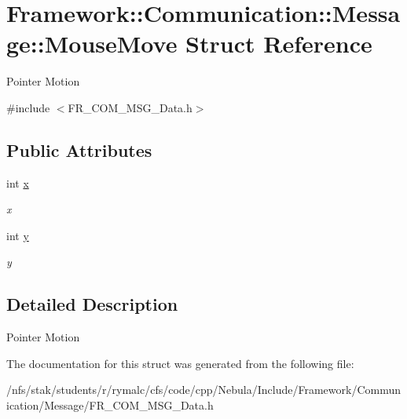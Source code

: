 \hypertarget{structFramework_1_1Communication_1_1Message_1_1MouseMove}{
\section{Framework::Communication::Message::MouseMove Struct Reference}
\label{structFramework_1_1Communication_1_1Message_1_1MouseMove}
}


Pointer Motion  


{\ttfamily \#include $<$FR\_\-COM\_\-MSG\_\-Data.h$>$}\subsection*{Public Attributes}
\begin{DoxyCompactItemize}
\item 
\hypertarget{structFramework_1_1Communication_1_1Message_1_1MouseMove_a42aeef5b7d870ba398dfc891e0651383}{
int \hyperlink{structFramework_1_1Communication_1_1Message_1_1MouseMove_a42aeef5b7d870ba398dfc891e0651383}{x}}
\label{structFramework_1_1Communication_1_1Message_1_1MouseMove_a42aeef5b7d870ba398dfc891e0651383}

\begin{DoxyCompactList}\small\item\em x \item\end{DoxyCompactList}\item 
\hypertarget{structFramework_1_1Communication_1_1Message_1_1MouseMove_aa74e15fc9b568e291adeb81445892270}{
int \hyperlink{structFramework_1_1Communication_1_1Message_1_1MouseMove_aa74e15fc9b568e291adeb81445892270}{y}}
\label{structFramework_1_1Communication_1_1Message_1_1MouseMove_aa74e15fc9b568e291adeb81445892270}

\begin{DoxyCompactList}\small\item\em y \item\end{DoxyCompactList}\end{DoxyCompactItemize}


\subsection{Detailed Description}
Pointer Motion 

The documentation for this struct was generated from the following file:\begin{DoxyCompactItemize}
\item 
/nfs/stak/students/r/rymalc/cfs/code/cpp/Nebula/Include/Framework/Communication/Message/FR\_\-COM\_\-MSG\_\-Data.h\end{DoxyCompactItemize}
